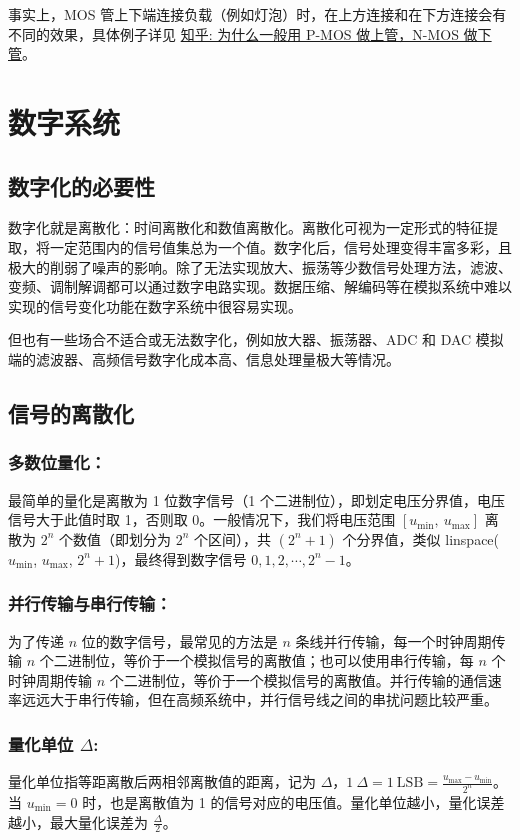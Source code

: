\documentclass[UTF8]{report}
\theoremstyle{MyLineTheoremStyle} %
\theoremstyle{MyBlockTheoremStyle} %
\theoremstyle{MySubsubsectionStyle} %
\begin{document}
事实上，MOS 管上下端连接负载（例如灯泡）时，在上方连接和在下方连接会有不同的效果，具体例子详见 \href{https://www.zhihu.com/question/34634572/answer/3421289786}{知乎: 为什么一般用 P-MOS 做上管，N-MOS 做下管}。

\section{数字系统}

\subsection{数字化的必要性}
数字化就是离散化：时间离散化和数值离散化。离散化可视为一定形式的特征提取，将一定范围内的信号值集总为一个值。数字化后，信号处理变得丰富多彩，且极大的削弱了噪声的影响。除了无法实现放大、振荡等少数信号处理方法，滤波、变频、调制解调都可以通过数字电路实现。数据压缩、解编码等在模拟系统中难以实现的信号变化功能在数字系统中很容易实现。

但也有一些场合不适合或无法数字化，例如放大器、振荡器、ADC 和 DAC 模拟端的滤波器、高频信号数字化成本高、信息处理量极大等情况。

\subsection{信号的离散化}

\subsubsection{多数位量化：}
最简单的量化是离散为 1 位数字信号（1 个二进制位），即划定电压分界值，电压信号大于此值时取 1，否则取 0。一般情况下，我们将电压范围 $[u_{\text{min}},\ u_{\text{max}}]$ 离散为 $2^n$ 个数值（即划分为 $2^n$ 个区间），共 $(2^n + 1)$ 个分界值，类似 linspace($u_{\text{min}}$, $u_{\text{max}}$, $2^n+1$)，最终得到数字信号 $0, 1, 2, \cdots, 2^n - 1$。

\subsubsection{并行传输与串行传输：}
为了传递 $n$ 位的数字信号，最常见的方法是 $n$ 条线并行传输，每一个时钟周期传输 $n$ 个二进制位，等价于一个模拟信号的离散值；也可以使用串行传输，每 $n$ 个时钟周期传输 $n$ 个二进制位，等价于一个模拟信号的离散值。并行传输的通信速率远远大于串行传输，但在高频系统中，并行信号线之间的串扰问题比较严重。

\subsubsection{量化单位 $\Delta$: }
量化单位指等距离散后两相邻离散值的距离，记为 $\Delta$，$1\  \Delta = 1\  \text{LSB} =  \frac{u_{\text{max}} - u_{\text{min}}}{2^n}$。当 $u_{\text{min}} = 0$ 时，也是离散值为 1 的信号对应的电压值。量化单位越小，量化误差越小，最大量化误差为 $\frac{\Delta }{2}$。
\end{document}
